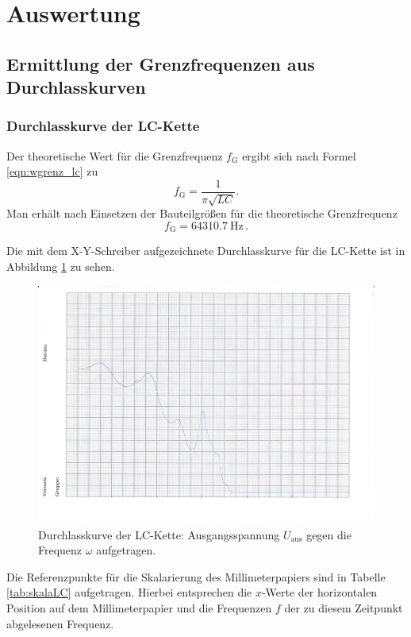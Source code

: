 \section{Auswertung}
\label{sec:Auswertung}




\subsection{Ermittlung der Grenzfrequenzen aus Durchlasskurven}

\subsubsection{Durchlasskurve der LC-Kette}
\label{sec:durchLC}
Der theoretische Wert für die Grenzfrequenz $f_{\text{G}}$ ergibt sich nach Formel \eqref{eqn:wgrenz_lc} zu
\begin{equation}
	f_{\text{G}} = \frac{1}{\pi \sqrt{LC}} \text{.}
\end{equation}
Man erhält nach Einsetzen der Bauteilgrößen für die theoretische Grenzfrequenz
\begin{equation*}
	f_{\text{G}} = \SI{64310.7}{\hertz} \, \text{.}
\end{equation*}

Die mit dem X-Y-Schreiber aufgezeichnete Durchlasskurve für die LC-Kette ist in Abbildung
\ref{fig:durchiLC} zu sehen.
\begin{figure}
	\centering
	\includegraphics[width=1.02\textwidth]{Bilder/durchlasskurve_lc_kette.jpg}
	\caption{Durchlasskurve der LC-Kette: Ausgangsspannung $U_{\text{aus}}$ gegen die
		Frequenz $\omega$ aufgetragen.}
	\label{fig:durchiLC}
\end{figure}
Die Referenzpunkte für die Skalarierung des Millimeterpapiers sind in Tabelle
\ref{tab:skalaLC} aufgetragen. Hierbei entsprechen die $x$-Werte der horizontalen Position
auf dem Millimeterpapier und die Frequenzen $f$ der zu diesem Zeitpunkt abgelesenen Frequenz.

